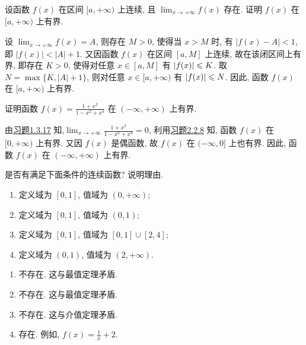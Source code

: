 \begin{exercise}[2.2.8]\label{exe:2.2.8}
    设函数 $f(x)$ 在区间 $[a, +\infty)$ 上连续, 且 $\lim_{x \to +\infty} f(x)$ 存在. 证明 $f(x)$ 在 $[a, +\infty)$ 上有界.
\end{exercise}

\begin{solution}
    设 $\lim_{x \to +\infty} f(x) = A$, 则存在 $M > 0$, 使得当 $x > M$ 时, 有 $|f(x) - A| < 1$, 即 $|f(x)| < |A| + 1$. 又因函数 $f(x)$ 在区间 $[a,M]$ 上连续, 故在该闭区间上有界, 即存在 $K > 0$, 使得对任意 $x \in [a,M]$ 有 $|f(x)| \leqslant K$. 取 $N = \max\{K, |A| + 1\}$, 则对任意 $x \in [a, +\infty)$ 有 $|f(x)| \leqslant N$. 因此, 函数 $f(x)$ 在 $[a, +\infty)$ 上有界.
\end{solution}

\begin{exercise}[2.2.9]
    证明函数 $f(x) = \frac{1+x^2}{1-x^2+x^4}$ 在 $(-\infty, +\infty)$ 上有界.
\end{exercise}

\begin{solution}
    由\hyperref[{exe:1.3.17}]{习题1.3.17} 知,$\lim_{x \to +\infty} \frac{1+x^2}{1-x^2+x^4} = 0$, 利用\hyperref[exe:2.2.8]{习题2.2.8} 知, 函数 $f(x)$ 在 $[0, +\infty)$ 上有界. 又因 $f(x)$ 是偶函数, 故 $f(x)$ 在 $(-\infty, 0]$ 上也有界. 因此, 函数 $f(x)$ 在 $(-\infty, +\infty)$ 上有界.
\end{solution}

\begin{exercise}[2.2.10]
    是否有满足下面条件的连续函数? 说明理由.
    \begin{enumerate}
        \item 定义域为 $[0,1]$, 值域为 $(0, +\infty)$;
        \item 定义域为 $[0,1]$, 值域为 $(0,1)$;
        \item 定义域为 $[0,1]$, 值域为 $[0,1]\cup[2,4]$;
        \item 定义域为 $(0,1)$, 值域为 $(2, +\infty)$.
    \end{enumerate}
\end{exercise}

\begin{solution}
    \begin{enumerate}
        \item 不存在. 这与最值定理矛盾.
        \item 不存在. 这与最值定理矛盾.
        \item 不存在. 这与介值定理矛盾.
        \item 存在. 例如, $f(x) = \frac{1}{x} + 2$.
    \end{enumerate}
\end{solution}


